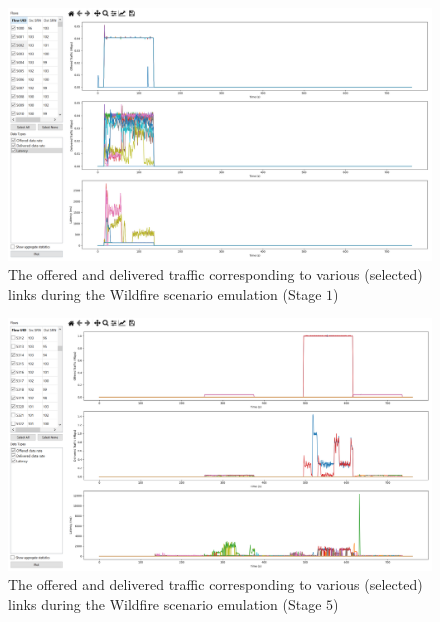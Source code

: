 \begin{figure} [htb]
    \centerline{
    \includegraphics[width = 1.0\textwidth]{Wildfire_NET.PNG}}
    \caption{The offered and delivered traffic corresponding to various (selected) links during the Wildfire scenario emulation (Stage $1$)}
    \label{fig:B.14}
\end{figure}
\begin{figure} [htb]
    \centerline{
    \includegraphics[width = 1.0\textwidth]{Wildfire_NET_2.PNG}}
    \caption{The offered and delivered traffic corresponding to various (selected) links during the Wildfire scenario emulation (Stage $5$)}
    \label{fig:B.15}
\end{figure}

